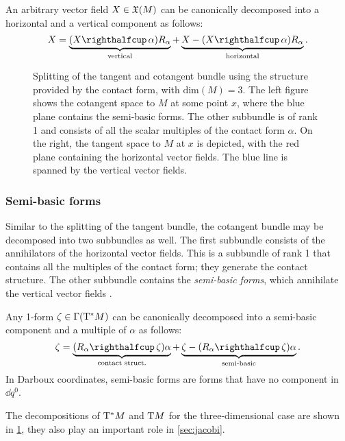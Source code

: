 An arbitrary vector field \(X \in \mathfrak{X}\qty(M)\) can be canonically decomposed into a horizontal and a vertical component as follows:
\begin{equation}
    X = \underbrace{(\intpr{X}{\alpha})R_\alpha}_\text{vertical} + \underbrace{X - (\intpr{X}{\alpha})R_\alpha}_\text{horizontal}.
    \label{eq:vfield_splitting}
\end{equation}

\begin{figure}[ht!]
    \centering
    
    \caption{Splitting of the tangent and cotangent bundle using the structure provided by the contact form, with \(\text{dim}(M) = 3\). The left figure shows the cotangent space to \(M\) at some point \(x\), where the blue plane contains the semi-basic forms. The other subbundle is of rank 1 and consists of all the scalar multiples of the contact form \(\alpha\). On the right, the tangent space to \(M\) at \(x\) is depicted, with the red plane containing the horizontal vector fields. The blue line is spanned by the vertical vector fields.}
    \label{fig:contact_spaces}
\end{figure}

\subsubsection{Semi-basic forms} 
Similar to the splitting of the tangent bundle, the cotangent bundle may be decomposed into two subbundles as well. The first subbundle consists of the annihilators of the horizontal vector fields. This is a subbundle of rank 1 that contains all the multiples of the contact form; they generate the contact structure. The other subbundle contains the \emph{semi-basic forms}, which annihilate the vertical vector fields \cite{Libermann1987}.

Any 1-form \(\zeta \in \mathrm{\Gamma}\qty(\mathrm{T}^*M)\) can be canonically decomposed into a semi-basic component and a multiple of \(\alpha\) as follows:
\begin{equation}
    \zeta = \underbrace{(\intpr{R_\alpha}{\zeta})\alpha}_\text{contact struct.} + \underbrace{\zeta - (\intpr{R_\alpha}{\zeta})\alpha}_\text{semi-basic}. 
    \label{eq:form_splitting}
\end{equation}
In Darboux coordinates, semi-basic forms are forms that have no component in \(\dd{q^0}\).

The decompositions of \(\mathrm{T}^*M\) and \(\mathrm{T}M\) for the three-dimensional case are shown in \cref{fig:contact_spaces}, they also play an important role in \cref{sec:jacobi}.

